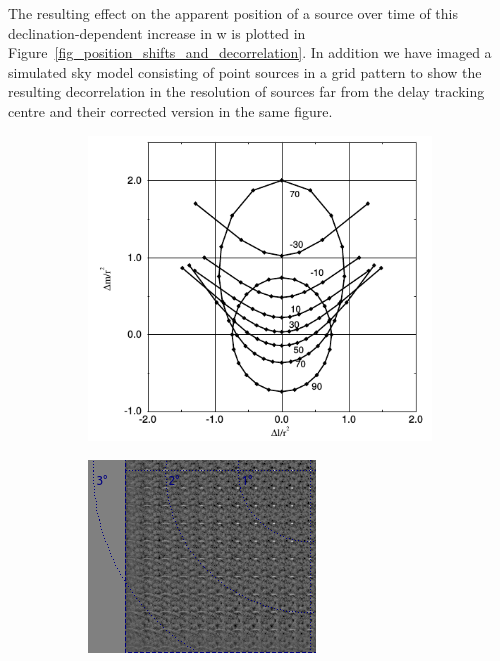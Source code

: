 The resulting effect on the apparent position of a source over time of this declination-dependent increase in w is plotted in Figure~\ref{fig_position_shifts_and_decorrelation}. In addition 
we have imaged a simulated sky model consisting of point sources in a grid pattern to show the resulting decorrelation in the resolution of sources far from the delay tracking centre 
and their corrected version in the same figure.

\begin{figure}[ht!]
  \begin{mdframed}
    \centering
    \begin{subfigure}[b]{0.6\textwidth}
      \centering
      \includegraphics[width=\textwidth]{images/apparent_position_shifts.png}
      \caption{}
    \end{subfigure}
    \begin{subfigure}[b]{0.49\textwidth}
      \centering
      \includegraphics[width=\textwidth]{images/widefield_meerkat.png}

\end{subfigure}
\end{mdframed}
\end{figure}
